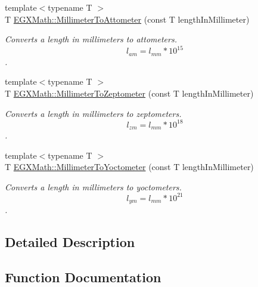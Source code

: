 \begin{DoxyCompactItemize}
{\footnotesize template$<$typename T $>$ }\\T \mbox{\hyperlink{group___e_g_x_math-_conversions-_length_conversions-_millimeter-_s_i_ga4403d88c0af8819b1d6e70057a1457b3}{E\+G\+X\+Math\+::\+Millimeter\+To\+Attometer}} (const T length\+In\+Millimeter)
\begin{DoxyCompactList}\small\item\em Converts a length in millimeters to attometers. \[ l_{am}=l_{mm} * 10^{15} \]. \end{DoxyCompactList}\item 
{\footnotesize template$<$typename T $>$ }\\T \mbox{\hyperlink{group___e_g_x_math-_conversions-_length_conversions-_millimeter-_s_i_ga7973ce559c88b84035d9653e26e4464c}{E\+G\+X\+Math\+::\+Millimeter\+To\+Zeptometer}} (const T length\+In\+Millimeter)
\begin{DoxyCompactList}\small\item\em Converts a length in millimeters to zeptometers. \[ l_{zm}=l_{mm} * 10^{18} \]. \end{DoxyCompactList}\item 
{\footnotesize template$<$typename T $>$ }\\T \mbox{\hyperlink{group___e_g_x_math-_conversions-_length_conversions-_millimeter-_s_i_ga7f8020bb633d6ed2cd874a8c66d2893d}{E\+G\+X\+Math\+::\+Millimeter\+To\+Yoctometer}} (const T length\+In\+Millimeter)
\begin{DoxyCompactList}\small\item\em Converts a length in millimeters to yoctometers. \[ l_{ym}=l_{mm} * 10^{21} \]. \end{DoxyCompactList}\end{DoxyCompactItemize}


\subsection{Detailed Description}


\subsection{Function Documentation}
\mbox{\label{group___e_g_x_math-_conversions-_length_conversions-_millimeter-_s_i_ga4403d88c0af8819b1d6e70057a1457b3}} 
